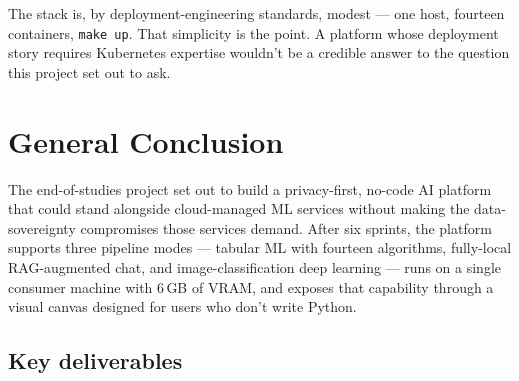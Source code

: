 \documentclass[12pt, a4paper]{report}
\begin{document}
The stack is, by deployment-engineering standards, modest --- one
host, fourteen containers, \texttt{make up}. That simplicity is
the point. A platform whose deployment story requires Kubernetes
expertise wouldn't be a credible answer to the question this
project set out to ask.

\chapter*{General Conclusion}

The end-of-studies project set out to build a privacy-first,
no-code AI platform that could stand alongside cloud-managed ML
services without making the data-sovereignty compromises those
services demand. After six sprints, the platform supports three
pipeline modes --- tabular ML with fourteen algorithms,
fully-local RAG-augmented chat, and image-classification deep
learning --- runs on a single consumer machine with $6$\,GB of
VRAM, and exposes that capability through a visual canvas designed
for users who don't write Python.

\section*{Key deliverables}
\end{document}
